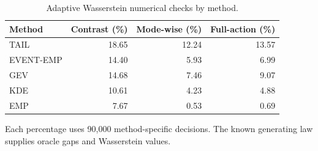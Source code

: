 \begin{table}[tbp]\centering\small
\caption{Adaptive Wasserstein numerical checks by method.}\label{tab:adaptive-w1-method}
\begin{tabular}{@{}lrrr@{}}\toprule Method & Contrast (\%) & Mode-wise (\%) & Full-action (\%)\\\midrule
TAIL & 18.65 & 12.24 & 13.57\\
EVENT-EMP & 14.40 & 5.93 & 6.99\\
GEV & 14.68 & 7.46 & 9.07\\
KDE & 10.61 & 4.23 & 4.88\\
EMP & 7.67 & 0.53 & 0.69\\
\bottomrule\end{tabular}\par\smallskip\footnotesize Each percentage uses 90,000 method-specific decisions. The known generating law supplies oracle gaps and Wasserstein values.\end{table}